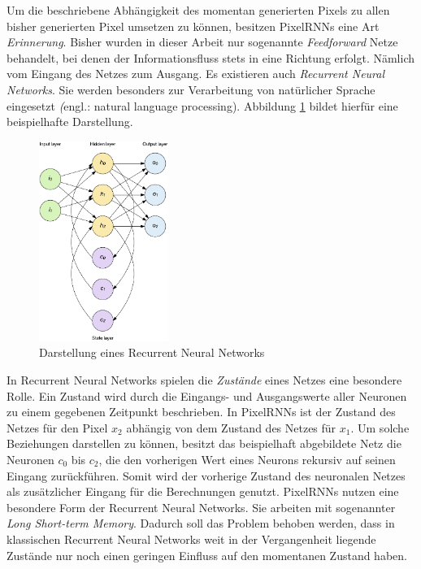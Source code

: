 Um die beschriebene Abhängigkeit des momentan generierten Pixels zu allen bisher generierten Pixel umsetzen zu können, besitzen \acp{PixelRNN} eine Art \emph{Erinnerung}. Bisher wurden in dieser Arbeit nur sogenannte \emph{Feedforward} Netze behandelt, bei denen der Informationsfluss stets in eine Richtung erfolgt. Nämlich vom Eingang des Netzes zum Ausgang. Es existieren auch \emph{Recurrent Neural Networks}. Sie werden besonders zur Verarbeitung von natürlicher Sprache eingesetzt \emph(engl.: natural language processing). Abbildung \ref{fig:RNN} bildet hierfür eine beispielhafte Darstellung.

\begin{figure}[H]
   \centering
   \includegraphics[width=0.375\textwidth]{images/Generative Networks/RNN.png}
   \caption{Darstellung eines Recurrent Neural Networks \cite{ibmRNN}}
   \label{fig:RNN}
\end{figure}

In Recurrent Neural Networks spielen die \emph{Zustände} eines Netzes eine besondere Rolle. Ein Zustand wird durch die Eingangs- und Ausgangswerte aller Neuronen zu einem gegebenen Zeitpunkt beschrieben. In \acp{PixelRNN} ist der Zustand des Netzes für den Pixel $x_{2}$ abhängig von dem Zustand des Netzes für $x_{1}$. Um solche Beziehungen darstellen zu können, besitzt das beispielhaft abgebildete Netz die Neuronen $c_{0}$ bis $c_{2}$, die den vorherigen Wert eines Neurons rekursiv auf seinen Eingang zurückführen. Somit wird der vorherige Zustand des neuronalen Netzes als zusätzlicher Eingang für die Berechnungen genutzt. \acp{PixelRNN} nutzen eine besondere Form der Recurrent Neural Networks. Sie arbeiten mit sogenannter \emph{Long Short-term Memory}. Dadurch soll das Problem behoben werden, dass in klassischen Recurrent Neural Networks weit in der Vergangenheit liegende Zustände nur noch einen geringen Einfluss auf den momentanen Zustand haben. \cite{generativeModelsSurvey}

